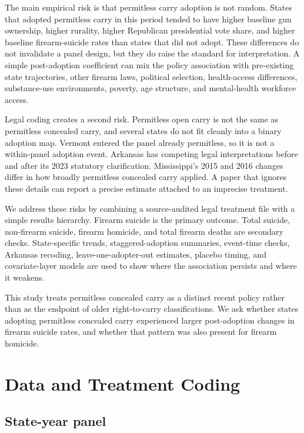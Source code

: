 \documentclass[11pt]{article}
\begin{document}
The main empirical risk is that permitless carry adoption is not random. States that adopted permitless carry in this period tended to have higher baseline gun ownership, higher rurality, higher Republican presidential vote share, and higher baseline firearm-suicide rates than states that did not adopt. These differences do not invalidate a panel design, but they do raise the standard for interpretation. A simple post-adoption coefficient can mix the policy association with pre-existing state trajectories, other firearm laws, political selection, health-access differences, substance-use environments, poverty, age structure, and mental-health workforce access.

Legal coding creates a second risk. Permitless open carry is not the same as permitless concealed carry, and several states do not fit cleanly into a binary adoption map. Vermont entered the panel already permitless, so it is not a within-panel adoption event. Arkansas has competing legal interpretations before and after its 2023 statutory clarification. Mississippi's 2015 and 2016 changes differ in how broadly permitless concealed carry applied. A paper that ignores these details can report a precise estimate attached to an imprecise treatment.

We address these risks by combining a source-audited legal treatment file with a simple results hierarchy. Firearm suicide is the primary outcome. Total suicide, non-firearm suicide, firearm homicide, and total firearm deaths are secondary checks. State-specific trends, staggered-adoption summaries, event-time checks, Arkansas recoding, leave-one-adopter-out estimates, placebo timing, and covariate-layer models are used to show where the association persists and where it weakens.

This study treats permitless concealed carry as a distinct recent policy rather than as the endpoint of older right-to-carry classifications. We ask whether states adopting permitless concealed carry experienced larger post-adoption changes in firearm suicide rates, and whether that pattern was also present for firearm homicide.

\section*{Data and Treatment Coding}

\subsection*{State-year panel}
\end{document}
